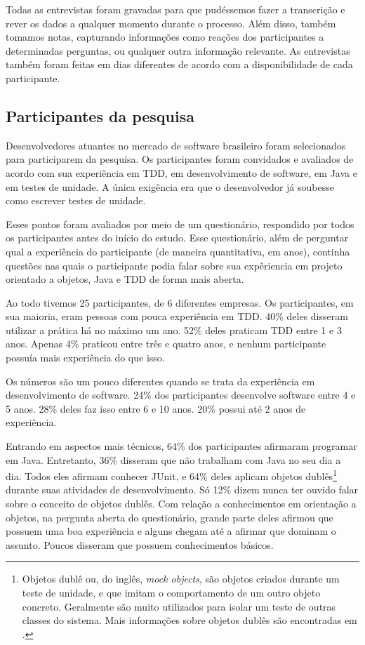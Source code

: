 \documentclass[conference]{IEEEtran}
\begin{document}
Todas as entrevistas foram gravadas para que pudéssemos fazer a
transcrição e rever os dados a qualquer momento durante o processo. Além disso,
também tomamos notas, capturando informações como reações dos 
participantes a determinadas perguntas, ou qualquer outra informação relevante. 
As entrevistas também foram feitas em dias diferentes de acordo com a disponibilidade
de cada participante.

\subsection{Participantes da pesquisa}
\label{sec:planejamento-participantes}

Desenvolvedores atuantes no mercado de 
software brasileiro foram selecionados para participarem da pesquisa.
Os participantes foram convidados e avaliados de acordo com sua experiência em TDD,
em desenvolvimento de software, em Java e em testes de unidade. A única exigência
era que o desenvolvedor já soubesse como escrever testes de unidade.

Esses pontos foram avaliados por meio de um questionário, 
respondido por todos os participantes antes do início do estudo. 
Esse questionário, além de perguntar qual a experiência
do participante (de maneira quantitativa, em anos), 
continha questões nas quais o participante
podia falar sobre sua expêriencia em projeto orientado a objetos,
Java e TDD de forma mais aberta.

Ao todo tivemos 25 participantes, de 6 diferentes empresas.
Os participantes, em sua maioria, eram pessoas com pouca experiência em TDD.
40\% deles disseram utilizar a prática há no máximo um ano. 52\% deles praticam TDD
entre 1 e 3 anos. Apenas 4\% praticou entre três e quatro anos, e nenhum participante
possuía mais experiência do que isso. 

Os números são um pouco diferentes quando se trata da experiência em desenvolvimento
de software. 24\% dos participantes desenvolve software entre 4 e 5 anos.
28\% deles faz isso entre 6 e 10 anos. 20\% possui até 2 anos de experiência.

Entrando em aspectos mais técnicos, 64\% dos participantes afirmaram programar em Java. Entretanto,
36\% disseram que não trabalham com Java no seu dia a dia. Todos eles afirmam conhecer JUnit,
e 64\% deles aplicam objetos dublês\footnote{Objetos dublê ou, do inglês, 
\textit{mock objects}, são objetos criados durante um teste de unidade, e que imitam o comportamento de um
outro objeto concreto. Geralmente são muito utilizados para isolar um teste de outras classes
do sistema. Mais informações sobre objetos dublês são encontradas em \cite{mocks}.}
durante suas atividades de desenvolvimento. Só 12\% dizem nunca ter ouvido falar sobre o conceito de objetos dublês. 
Com relação a conhecimentos
em orientação a objetos, na pergunta aberta do questionário, grande parte deles 
afirmou que possuem uma boa experiência e alguns
chegam até a afirmar que dominam o assunto. Poucos disseram que possuem conhecimentos
básicos.
\end{document}
